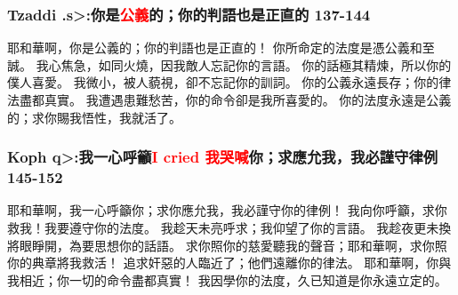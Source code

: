 \subsubsection{Tzaddi  \<.s>:你是\textcolor{red}{公義}的；你的判語也是正直的 137-144}
耶和華啊，你是公義的；你的判語也是正直的！
你所命定的法度是憑公義和至誠。
我心焦急，如同火燒，因我敵人忘記你的言語。
你的話極其精煉，所以你的僕人喜愛。
我微小，被人藐視，卻不忘記你的訓詞。
你的公義永遠長存；你的律法盡都真實。
我遭遇患難愁苦，你的命令卻是我所喜愛的。
你的法度永遠是公義的；求你賜我悟性，我就活了。

\subsubsection{Koph  \<q>:我一心呼籲\textcolor{red}{I cried 我哭喊}你；求應允我，我必謹守律例 145-152}
耶和華啊，我一心呼籲你；求你應允我，我必謹守你的律例！
我向你呼籲，求你救我！我要遵守你的法度。
我趁天未亮呼求；我仰望了你的言語。
我趁夜更未換將眼睜開，為要思想你的話語。
求你照你的慈愛聽我的聲音；耶和華啊，求你照你的典章將我救活！
追求奸惡的人臨近了；他們遠離你的律法。
耶和華啊，你與我相近；你一切的命令盡都真實！
我因學你的法度，久已知道是你永遠立定的。

